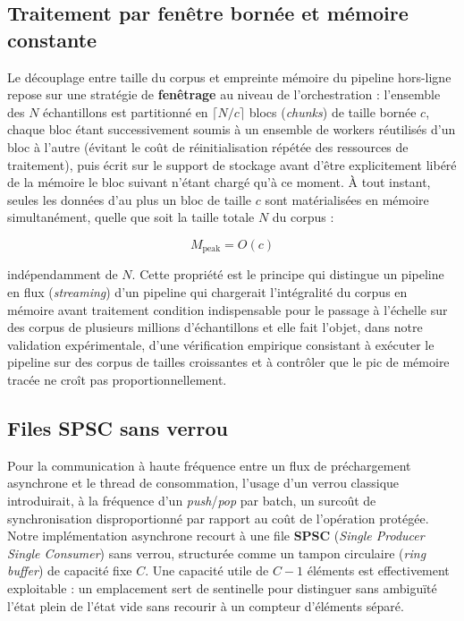 \documentclass[12pt,a4paper]{report}
\begin{document}
\subsection{Traitement par fenêtre bornée et mémoire constante}

Le découplage entre taille du corpus et empreinte mémoire du pipeline hors-ligne repose sur une stratégie de \textbf{fenêtrage} au niveau de l'orchestration : l'ensemble des $N$ échantillons est partitionné en $\lceil N / c \rceil$ blocs (\textit{chunks}) de taille bornée $c$, chaque bloc étant successivement soumis à un ensemble de workers réutilisés d'un bloc à l'autre (évitant le coût de réinitialisation répétée des ressources de traitement), puis écrit sur le support de stockage avant d'être explicitement libéré de la mémoire le bloc suivant n'étant chargé qu'à ce moment. À tout instant, seules les données d'au plus un bloc de taille $c$ sont matérialisées en mémoire simultanément, quelle que soit la taille totale $N$ du corpus :

\begin{equation}
\label{eq:memoire_bornee}
M_{\text{peak}} = O(c)
\end{equation}

indépendamment de $N$. Cette propriété est le principe qui distingue un pipeline en flux (\textit{streaming}) d'un pipeline qui chargerait l'intégralité du corpus en mémoire avant traitement condition indispensable pour le passage à l'échelle sur des corpus de plusieurs millions d'échantillons et elle fait l'objet, dans notre validation expérimentale, d'une vérification empirique consistant à exécuter le pipeline sur des corpus de tailles croissantes et à contrôler que le pic de mémoire tracée ne croît pas proportionnellement.

\subsection{Files SPSC sans verrou}

Pour la communication à haute fréquence entre un flux de préchargement asynchrone et le thread de consommation, l'usage d'un verrou classique introduirait, à la fréquence d'un \textit{push}/\textit{pop} par batch, un surcoût de synchronisation disproportionné par rapport au coût de l'opération protégée. Notre implémentation asynchrone recourt à une file \textbf{SPSC} (\textit{Single Producer Single Consumer}) sans verrou, structurée comme un tampon circulaire (\textit{ring buffer}) de capacité fixe $C$. Une capacité utile de $C-1$ éléments est effectivement exploitable : un emplacement sert de sentinelle pour distinguer sans ambiguïté l'état plein de l'état vide sans recourir à un compteur d'éléments séparé.
\end{document}
